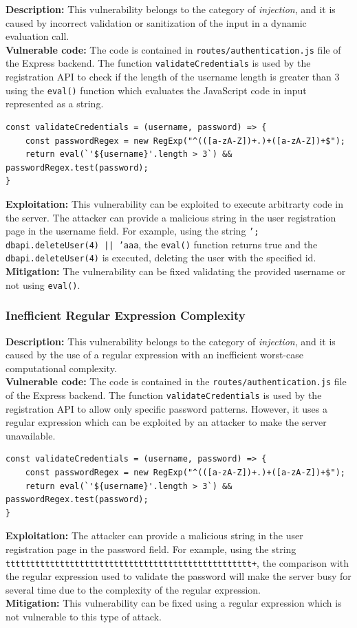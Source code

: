 \documentclass[]{article}
\begin{document}
\textbf{Description:} This vulnerability belongs to the category of {\it injection}, and it is caused by incorrect validation or sanitization of 
the input in a dynamic evaluation call.
\\ 
\textbf{Vulnerable code:} The code is contained in \texttt{routes/authentication.js} file of the Express backend. The function \texttt{validateCredentials} 
is used by the registration API to check if the length of the username length is greater than 3 using the \texttt{eval()} function which evaluates the 
JavaScript code in input represented as a string. 
\begin{lstlisting}
const validateCredentials = (username, password) => {
    const passwordRegex = new RegExp("^(([a-zA-Z])+.)+([a-zA-Z])+$");
    return eval(`'${username}'.length > 3`) && passwordRegex.test(password);
}
\end{lstlisting}
\textbf{Exploitation:} This vulnerability can be exploited to execute arbitrarty code in the server. The attacker can provide a malicious string in 
the user registration page in the username field. For example, using the string \texttt{'; dbapi.deleteUser(4) || 'aaa}, the \texttt{eval()} function 
returns true and the \texttt{dbapi.deleteUser(4)} is executed, deleting the user with the specified id. 
\\ 
\textbf{Mitigation:} The vulnerability can be fixed validating the provided username or not using \texttt{eval()}.  

\subsubsection{Inefficient Regular Expression Complexity}
\label{subsubsec:inefficient_regular_expression_complexity}
\textbf{Description:} This vulnerability belongs to the category of {\it injection}, and it is caused by the use of a regular expression with an inefficient 
worst-case computational complexity.
\\
\textbf{Vulnerable code:} The code is contained in the \texttt{routes/authentication.js} file of the Express backend. The function \texttt{validateCredentials}
is used by the registration API to allow only specific password patterns. However, it uses a regular expression which can be exploited by an attacker to make 
the server unavailable. 

\begin{lstlisting}
const validateCredentials = (username, password) => {
    const passwordRegex = new RegExp("^(([a-zA-Z])+.)+([a-zA-Z])+$");
    return eval(`'${username}'.length > 3`) && passwordRegex.test(password);
}
\end{lstlisting}
\textbf{Exploitation:} The attacker can provide a malicious string in the user registration page in the password field. For example, using the string 
\texttt{tttttttttttttttttttttttttttttttttttttttttttttttttt+}, the comparison with the regular expression used to validate the password will make the 
server busy for several time due to the complexity of the regular expression. 
\\ 
\textbf{Mitigation:} This vulnerability can be fixed using a regular expression which is not vulnerable to this type of attack.
\end{document}
